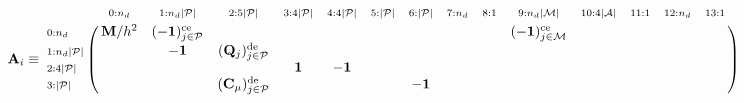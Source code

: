 \documentclass[a4paper,10pt]{article}
\begin{document}
\begin{equation}\notag
\mathbf{A}_i \equiv
\bordermatrix{
                                    &    \scriptstyle{0 : n_d}                      &              \scriptstyle{1 : n_d |\mathcal{P}|}          &        \scriptstyle{2 : 5 |\mathcal{P}|}       &  \scriptstyle{3 : 4 |\mathcal{P}|}   & \scriptstyle{4 : 4|\mathcal{P}|}    &   \scriptstyle{5 : |\mathcal{P}| }  & \scriptstyle{6 : |\mathcal{P}| }  & \scriptstyle{7 : n_d}  &   \scriptstyle{8 : 1 } & \scriptstyle{9 : n_d |\mathcal{M}| }             & \scriptstyle{10: 4 |\mathcal{A}| }    &  \scriptstyle{11:1}        & \scriptstyle{12:n_d}   & \scriptstyle{13:1}  \cr
\scriptstyle{0:n_d}                 &  \mathbf{M}/h^2                               & (-\mathbf{1})_{j \in \mathcal{P}}^\text{ce}               &                                                &                                      &                                     &                                     &                                   &                        &                        & (-\mathbf{1})_{j \in \mathcal{M}}^\text{ce}      &                                       &                                       &                        &                      \cr
\scriptstyle{1:n_d |\mathcal{P}|}   &                                               &  -\mathbf{1}                                              &  (\mathbf{Q}_j)_{j \in \mathcal{P}}^\text{de}  &                                      &                                     &                                     &                                   &                        &                        &                                                  &                                       &                                 &                        &                       \cr
\scriptstyle{2:4 |\mathcal{P}|}     &                                               &                                                           &                                                &  \mathbf{1}                          &  -\mathbf{1}                        &                                     &                                   &                        &                        &                                                  &                                       &                          &                         &                        \cr
\scriptstyle{3:  |\mathcal{P}|}     &                                               &                                                           &(\mathbf{C}_\mu)_{j \in \mathcal{P}}^\text{de}  &                                      &                                     &                                     & -\mathbf{1}                       &                        &                        &                                                  &                                       &                                 &                        &                        \cr
}
\end{equation}
\end{document}
